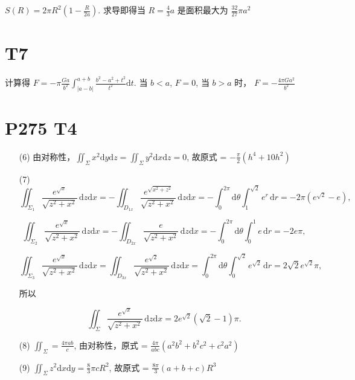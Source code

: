 \documentclass{article}
\newcommand{\dd}{\mathrm{d}}
\begin{document}
$S(R) = 2\pi R^2\left(1 - \frac{R}{2a}\right)$. 求导即得当 $R = \frac{4}{3}a$ 是面积最大为 $\frac{32}{27}\pi a^2$

\section*{T7}

计算得 $F = -\pi\frac{Ga}{b^2}\int_{\left\lvert a - b\right\rvert}^{a + b}\frac{b^2 - a^2 + t^2}{t^2}\dd t$. 当 $b < a$, $F = 0$, 当 $b > a$ 时， $F = -\frac{4\pi Ga^2}{b^2}$

\section*{P275 T4}

\begin{itemize}
    \item [(6)] 由对称性，$\iint_\Sigma x^2 \dd y \dd z = \iint_\Sigma y^2 \dd x \dd z = 0$, 故原式 = $-\frac{\pi}{2}\left(h^4 + 10h^2\right)$
    \item [(7)]
    \[
\iint_{\Sigma_1} \frac{e^{\sqrt{x}}}{\sqrt{z^2 + x^2}} \,\mathrm{d}z\mathrm{d}x = -\iint_{D_{1x}} \frac{e^{\sqrt{x^2 + z^2}}}{\sqrt{z^2 + x^2}} \,\mathrm{d}z\mathrm{d}x = -\int_0^{2\pi} \mathrm{d}\theta \int_1^{\sqrt{2}} e^r \,\mathrm{d}r = -2\pi (e^{\sqrt{2}} - e),
\]

\[
\iint_{\Sigma_2} \frac{e^{\sqrt{x}}}{\sqrt{z^2 + x^2}} \,\mathrm{d}z\mathrm{d}x = -\iint_{D_{2x}} \frac{e}{\sqrt{z^2 + x^2}} \,\mathrm{d}z\mathrm{d}x = -\int_0^{2\pi} \mathrm{d}\theta \int_0^1 e\,\mathrm{d}r = -2e\pi,
\]

\[
\iint_{\Sigma_3} \frac{e^{\sqrt{x}}}{\sqrt{z^2 + x^2}} \,\mathrm{d}z\mathrm{d}x = \iint_{D_{3x}} \frac{e^{\sqrt{2}}}{\sqrt{z^2 + x^2}} \,\mathrm{d}z\mathrm{d}x = \int_0^{2\pi} \mathrm{d}\theta \int_0^{\sqrt{2}} e^{\sqrt{2}} \,\mathrm{d}r = 2\sqrt{2}e^{\sqrt{2}}\pi,
\]

所以

\[
\iint_{\Sigma} \frac{e^{\sqrt{x}}}{\sqrt{z^2 + x^2}} \,\mathrm{d}z\mathrm{d}x = 2e^{\sqrt{2}} (\sqrt{2} - 1)\pi.
\]
    \item [(8)] $\iint_\Sigma = \frac{4\pi ab}{c}$, 由对称性，原式 = $\frac{4\pi}{abc}\left(a^2b^2 + b^2c^2 + c^2a^2\right)$
    \item [(9)] $\iint_\Sigma z^2 \dd x \dd y = \frac{8}{3}\pi cR^2$, 故原式 = $\frac{8\pi}{3}(a + b + c)R^3$
\end{itemize}
\end{document}
